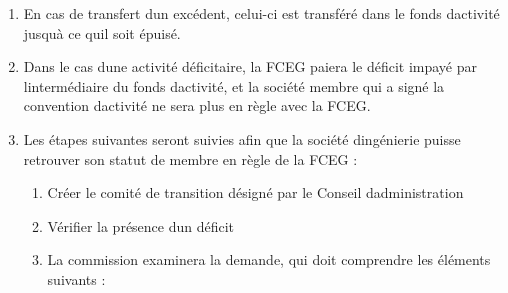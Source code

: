 \begin{enumerate}
 \item
  En cas de transfert d\textquotesingle un excédent, celui-ci est transféré dans le fonds d\textquotesingle activité jusqu\textquotesingle à ce qu\textquotesingle il soit épuisé.
 \item
  Dans le cas d\textquotesingle une activité déficitaire, la FCEG paiera le déficit impayé par l\textquotesingle intermédiaire du fonds d\textquotesingle activité, et la société membre qui a signé la convention d\textquotesingle activité ne sera plus en règle avec la FCEG.
 \item
  Les étapes suivantes seront suivies afin que la société d\textquotesingle ingénierie puisse retrouver son statut de membre en règle de la FCEG :

  \begin{enumerate}
   \item
    Créer le comité de transition désigné par le Conseil d\textquotesingle administration
   \item
    Vérifier la présence d\textquotesingle un déficit
   \item
    La commission examinera la demande, qui doit comprendre les éléments suivants :


\end{enumerate}
\end{enumerate}
